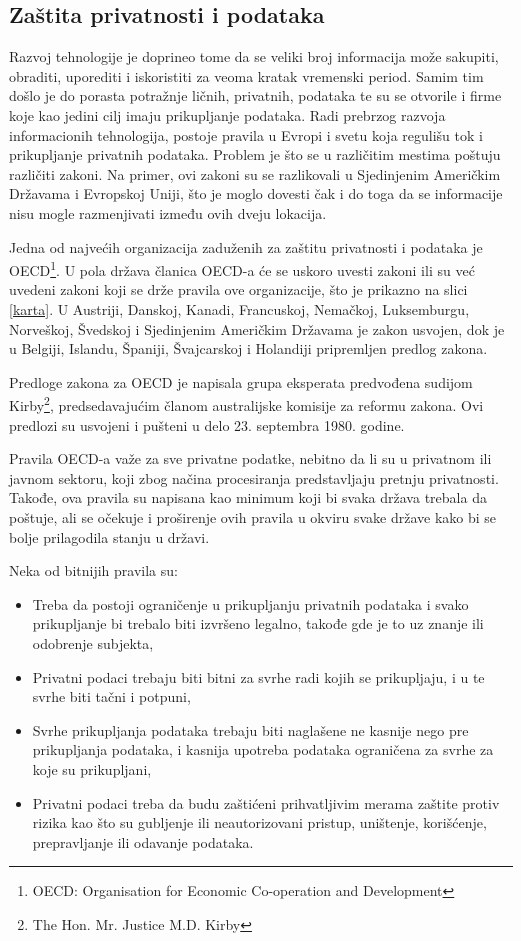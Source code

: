 \documentclass[a4paper]{article}
\begin{document}
{\subsection{Zaštita privatnosti i podataka}

Razvoj tehnologije je doprineo tome da se veliki broj informacija može sakupiti, obraditi, uporediti i iskoristiti za veoma kratak vremenski period. Samim tim došlo je do porasta potražnje ličnih, privatnih, podataka te su se otvorile i firme koje kao jedini cilj imaju prikupljanje podataka. Radi prebrzog razvoja informacionih tehnologija, postoje pravila u Evropi i svetu koja regulišu tok i prikupljanje privatnih podataka. Problem je što se u različitim mestima poštuju različiti zakoni. Na primer, ovi zakoni su se razlikovali u Sjedinjenim Američkim Državama i Evropskoj Uniji, što je moglo dovesti čak i do toga da se informacije nisu mogle razmenjivati između ovih dveju lokacija.

Jedna od najvećih organizacija zaduženih za zaštitu privatnosti i podataka je OECD\footnote{OECD: Organisation for Economic Co-operation and Development}. U pola država članica OECD-a će se uskoro uvesti zakoni ili su već uvedeni zakoni koji se drže pravila ove organizacije, što je prikazno na slici \ref{karta}. U Austriji, Danskoj, Kanadi, Francuskoj, Nemačkoj, Luksemburgu, Norveškoj, Švedskoj i Sjedinjenim Američkim Državama je zakon usvojen, dok je u Belgiji, Islandu, Španiji, Švajcarskoj i Holandiji pripremljen predlog zakona.\cite{OECD}

Predloge zakona za OECD je napisala grupa eksperata predvođena sudijom Kirby\footnote{The Hon. Mr. Justice M.D. Kirby}, predsedavajućim članom australijske komisije za reformu zakona. Ovi predlozi su usvojeni i pušteni u delo 23. septembra 1980. godine.

Pravila OECD-a važe za sve privatne podatke, nebitno da li su u privatnom ili javnom sektoru, koji zbog načina procesiranja predstavljaju pretnju privatnosti. Takođe, ova pravila su napisana kao minimum koji bi svaka država trebala da poštuje, ali se očekuje i proširenje ovih pravila u okviru svake države kako bi se bolje prilagodila stanju u državi.

Neka od bitnijih pravila su:\cite{Property}

\begin{itemize}
	\item{Treba da postoji ograničenje u prikupljanju privatnih podataka i svako prikupljanje bi trebalo biti izvršeno legalno, takođe gde je to uz znanje ili odobrenje subjekta,}
	\item{Privatni podaci trebaju biti bitni za svrhe radi kojih se prikupljaju, i u te svrhe biti tačni i potpuni,}
	\item{Svrhe prikupljanja podataka trebaju biti naglašene ne kasnije nego pre prikupljanja podataka, i kasnija upotreba podataka ograničena za svrhe za koje su prikupljani,}
	\item{Privatni podaci treba da budu zaštićeni prihvatljivim merama zaštite protiv rizika kao što su gubljenje ili neautorizovani pristup, uništenje, korišćenje, prepravljanje ili odavanje podataka.}
\end{itemize}

}
\end{document}
